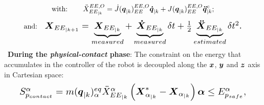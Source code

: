 \documentclass[letterpaper, 10 pt, conference]{ieeeconf}      %
\newcommand{\vect}[1]{\mbox{\boldmath${#1}$}}%
\begin{document}
\begin{equation} 
\text{with:   \hspace{6mm}} 
\ddot{X}_{EE_{|k}}^{EE,O} = \dot{J}(\vect{q}_{|k})_{EE}^{EE,O} \vect{\dot{q}}_{|k} + J(\vect{q}_{|k})_{EE}^{EE,O} \vect{\ddot{q}}_{|k}^{c};
\label{eq:v_futur}
\end{equation}
\begin{equation}
\text{and: \hspace{2.1mm}} 
\resizebox{0.8\hsize}{!}{$
\vect{X}_{EE_{|k+1}} = \underbrace{\vect{X}_{EE_{|k}}}_{measured} + \underbrace{\vect{\dot{X}}_{EE_{|k}}}_{measured} \delta t + \frac{1}{2} \underbrace{\vect{\ddot{X}}_{EE_{|k}}}_{estimated} \delta t^2.$}
\label{eq:X_k1_estimated}
\end{equation} 
\textbullet\ \textbf{During the \textit{physical-contact} phase}: 
The constraint on the energy that accumulates in the controller of the robot is decoupled along the $\vect{x}$, $\vect{y}$ and $\vect{z}$ axis in Cartesian space:
\begin{equation} 
\resizebox{0.92\hsize}{!}{$
S_{p_{contact}}^{\alpha} = m(\vect{q}_{|k})_{\alpha}^{eq} \ddot{X}_{EE_{|k}}^{\alpha} \left(\vect{X}_{\alpha_{|k}}^{*}-\vect{X}_{\alpha_{|k}}\right) \vect{\alpha} \leq E_{p_{safe}}^{\alpha},$}
\label{eq:Safe_constr_4_3_axisaaa}
\end{equation}
\end{document}
